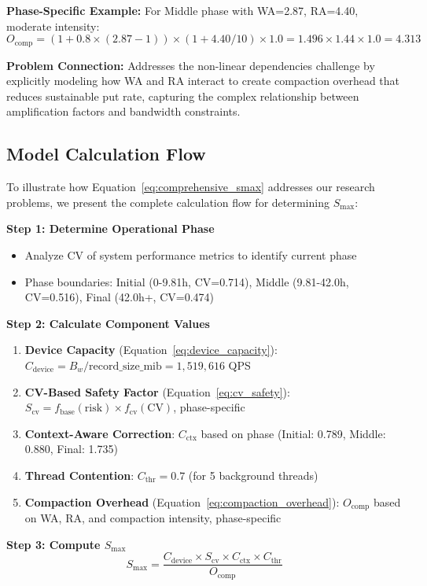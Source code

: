 \documentclass[11pt]{article}
\begin{document}
\textbf{Phase-Specific Example:} For Middle phase with WA=2.87, RA=4.40, moderate intensity:
\[
O_{\text{comp}} = (1 + 0.8 \times (2.87 - 1)) \times (1 + 4.40/10) \times 1.0 = 1.496 \times 1.44 \times 1.0 = 4.313
\]

\textbf{Problem Connection:} Addresses the non-linear dependencies challenge by explicitly modeling how WA and RA interact to create compaction overhead that reduces sustainable put rate, capturing the complex relationship between amplification factors and bandwidth constraints.

\subsection{Model Calculation Flow}

To illustrate how Equation~\ref{eq:comprehensive_smax} addresses our research problems, we present the complete calculation flow for determining $S_{\max}$:

\textbf{Step 1: Determine Operational Phase}
\begin{itemize}
    \item Analyze CV of system performance metrics to identify current phase
    \item Phase boundaries: Initial (0-9.81h, CV=0.714), Middle (9.81-42.0h, CV=0.516), Final (42.0h+, CV=0.474)
\end{itemize}

\textbf{Step 2: Calculate Component Values}
\begin{enumerate}
    \item \textbf{Device Capacity} (Equation~\ref{eq:device_capacity}): $C_{\text{device}} = B_w / \text{record\_size\_mib} = 1,519,616$ QPS
    \item \textbf{CV-Based Safety Factor} (Equation~\ref{eq:cv_safety}): $S_{\text{cv}} = f_{\text{base}}(\text{risk}) \times f_{\text{cv}}(\text{CV})$, phase-specific
    \item \textbf{Context-Aware Correction}: $C_{\text{ctx}}$ based on phase (Initial: 0.789, Middle: 0.880, Final: 1.735)
    \item \textbf{Thread Contention}: $C_{\text{thr}} = 0.7$ (for 5 background threads)
    \item \textbf{Compaction Overhead} (Equation~\ref{eq:compaction_overhead}): $O_{\text{comp}}$ based on WA, RA, and compaction intensity, phase-specific
\end{enumerate}

\textbf{Step 3: Compute $S_{\max}$}
\begin{equation}
S_{\max} = \frac{C_{\text{device}} \times S_{\text{cv}} \times C_{\text{ctx}} \times C_{\text{thr}}}{O_{\text{comp}}}
\end{equation}
\end{document}
